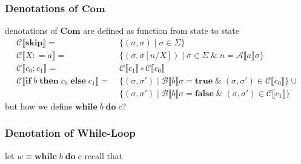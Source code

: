 \documentclass[12pt,aspectratio=169]{beamer}
\newcommand{\Com}{\mathbf{Com}}
\newcommand{\denoA}[1]{\mathcal{A} \llbracket #1 \rrbracket}
\newcommand{\denoB}[1]{\mathcal{B} \llbracket #1 \rrbracket}
\newcommand{\denoC}[1]{\mathcal{C} \llbracket #1 \rrbracket}
\newcommand{\true}{\mathbf{true}}
\newcommand{\false}{\mathbf{false}}
\newcommand{\Skip}{\mathbf{skip}}
\def\coloneqq{\mathrel{\mathop:}=}
\newcommand{\Assign}[2]{#1 \coloneqq #2}
\newcommand{\ITE}[3]{\mathbf{if}\; #1 \; \mathbf{then} \; #2 \; \mathbf{else} \; #3}
\newcommand{\While}[2]{\mathbf{while}\; #1 \; \mathbf{do} \; #2}
\begin{document}
\begin{frame}
    \frametitle{Denotations of $\Com$}
    denotations of $\Com$ are defined as function from state to state
    \begin{align*}
        \denoC{\Skip} =& \;\{(\sigma,\sigma) \mid \sigma \in \Sigma\}\\
        \denoC{\Assign{X}{a}} =& \;\{(\sigma,\sigma[n/X]) \mid \sigma \in \Sigma \; \& \; n = \denoA{a}\sigma\}\\
        \denoC{c_0;c_1} =& \;\denoC{c_1} \circ \denoC{c_0}\\
        \denoC{\ITE{b}{c_0}{c_1}} =& \;
            \{(\sigma,\sigma') \mid \denoB{b}\sigma = \true \; \& \; (\sigma, \sigma') \in \denoC{c_0}\} \cup\\
            & \;\{(\sigma,\sigma') \mid \denoB{b}\sigma = \false \; \& \; (\sigma, \sigma') \in \denoC{c_1}\}
    \end{align*}
    but how we define $\While{b}{c}$?
\end{frame}

\begin{frame}
    \frametitle{Denotation of While-Loop}
    let $w \equiv \While{b}{c}$
    recall that 
\end{frame}
\end{document}

